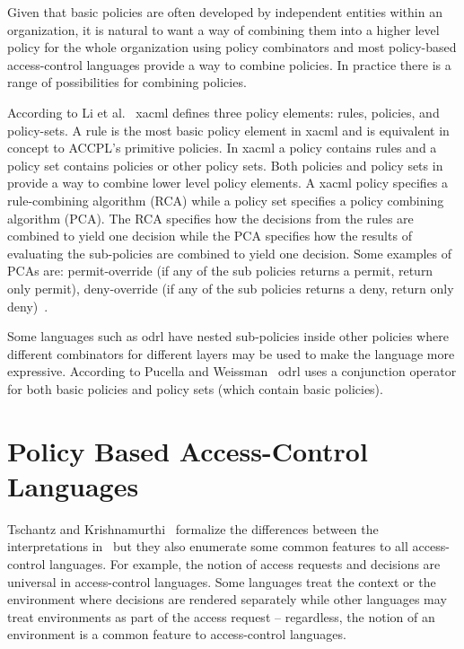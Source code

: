 Given that basic policies are often developed by independent entities within an organization, it is natural to want a way of combining them into a higher level policy for the whole organization using policy combinators and most policy-based access-control languages provide a way to combine policies. In practice there is a range of possibilities for combining policies. 

According to Li et al.~\cite{LiWQBRLL09} \ac{xacml} defines three policy elements: rules, policies, and policy-sets. A rule is the most basic policy element in \ac{xacml} and is equivalent in concept to \ac{ACCPL}'s primitive policies. In \ac{xacml} a policy contains rules and a policy set contains policies or other policy sets. Both policies and policy sets in provide a way to combine lower level policy elements. A \ac{xacml} policy specifies a rule-combining algorithm (RCA) while a policy set specifies a policy combining algorithm (PCA). The RCA specifies
how the decisions from the rules are combined to yield one decision while the PCA specifies how the results of evaluating the sub-policies are combined to
yield one decision. Some examples of PCAs are: permit-override (if any of the sub policies returns a permit, return only permit), deny-override (if any of the sub policies returns a deny, return only deny)~\cite{Tschantz}. 

Some languages such as \ac{odrl} have nested sub-policies inside other policies where different combinators for different layers may be used to make the language more expressive. According to Pucella and Weissman~\cite{pucella2006} \ac{odrl} uses a conjunction operator for both basic policies and policy sets (which contain basic policies).







\section{Policy Based Access-Control Languages}

Tschantz and Krishnamurthi~\cite{Tschantz} formalize the differences between the interpretations in~\cite{Tschantz} but they also enumerate some common features to all access-control languages. For example, the notion of access requests and decisions are universal in access-control languages. Some languages treat the context or the environment where decisions are rendered separately while other languages may treat environments as part of the access request -- regardless, the notion of an environment is a common feature to access-control languages.


